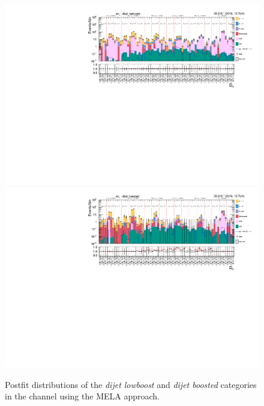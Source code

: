 \begin{figure}[h!]
    \centering       
        \includegraphics[width=\textwidth]{Figures/statana/Postfit_JEC_mela3D/postfit_fit_s_htt_et_3_13TeV.pdf}\\
        \includegraphics[width=\textwidth]{Figures/statana/Postfit_JEC_mela3D/postfit_fit_s_htt_et_4_13TeV.pdf}
    \caption{Postfit distributions of the \textit{dijet lowboost} and \textit{dijet boosted} categories in the \etau{} channel  using the MELA approach.}
\end{figure}
\clearpage
